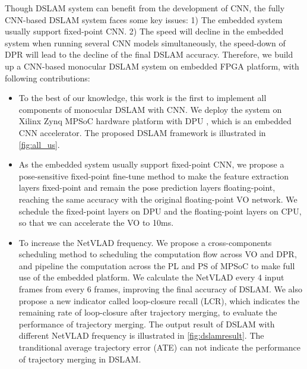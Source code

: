 Though DSLAM system can benefit from the development of CNN, the fully CNN-based DSLAM system faces some key issues: 1) The embedded system usually support fixed-point CNN. 2) The speed will decline in the embedded system when running several CNN models simultaneously, the speed-down of DPR will lead to the decline of the final DSLAM accuracy. Therefore, we build up a CNN-based monocular DSLAM system on embedded FPGA platform, with following contributions:

\begin{itemize}
\item To the best of our knowledge, this work is the first to implement all components of monocular DSLAM with CNN.
We deploy the system on Xilinx Zynq MPSoC hardware platform with DPU \cite{Tech:2019360}, which is an embedded CNN accelerator. The proposed DSLAM framework is illustrated in \cref{fig:all_us}.
\item As the embedded system usually support fixed-point CNN, we propose a pose-sensitive fixed-point fine-tune method to make the feature extraction layers fixed-point and remain the pose prediction layers floating-point, reaching the same accuracy with the original floating-point VO network. We schedule the fixed-point layers on DPU and the floating-point layers on CPU, so that we can accelerate the VO to 10ms.
\item To increase the NetVLAD frequency. We propose a cross-components scheduling method to scheduling the computation flow across VO and DPR, and pipeline the computation across the PL and PS of MPSoC to make full use of the embedded platform. We calculate the NetVLAD every 4 input frames from every 6 frames, improving the final accuracy of DSLAM. 
We also propose a new indicator called loop-closure recall (LCR), which indicates the remaining rate of loop-closure after trajectory merging, to evaluate the performance of trajectory merging. The output result of DSLAM with different NetVLAD frequency is illustrated in \cref{fig:dslamresult}. The tranditional average trajectory error (ATE) can not indicate the performance of trajectory merging in DSLAM.
\end{itemize}



